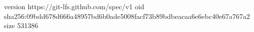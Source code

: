 version https://git-lfs.github.com/spec/v1
oid sha256:09bdd678d666a48957bd6b0ade5008facf73b89bdbeacaa6e6ebc40e67a767a2
size 531386
